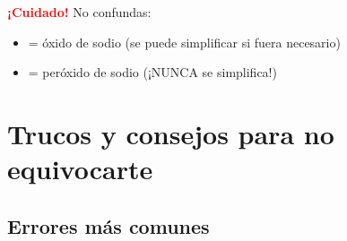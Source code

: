 \vspace{0.3cm}
\begin{remark}
    \textbf{\textcolor{red}{¡Cuidado!}} No confundas:
    \begin{itemize}
        \item {} = óxido de sodio (se puede simplificar si fuera necesario)
        \item {} = peróxido de sodio (¡NUNCA se simplifica!)
    \end{itemize}
\end{remark}
\vspace{0.3cm}


\section{Trucos y consejos para no equivocarte}

\subsection{Errores más comunes}


